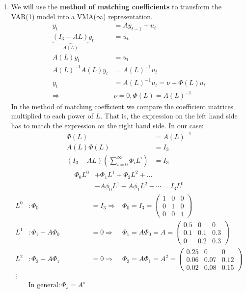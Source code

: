 \begin{enumerate}
\item We will use the \textbf{method of matching coefficients} to transform the VAR(1) model into a VMA(\(\infty\)) representation.
\begin{align*}
	y_t &= A y_{t-1} + u_t\\
	\underbrace{(I_3 - A L)}_{A(L)} y_t &= u_t\\
	A(L) y_t &= u_t \\
	{A(L)}^{-1}A(L) y_t &= {A(L)}^{-1} u_t\\
	y_t &= {A(L)}^{-1} u_t = \nu + \Phi(L) u_t\\
	\Rightarrow & \nu= 0, \Phi(L) = {A(L)}^{-1}
\end{align*}
In the method of matching coefficient we compare the coefficient matrices multiplied to each power of \(L\).
That is, the expression on the left hand side has to match the expression on the right hand side.
In our case:
\begin{align*}
	\Phi(L) &= {A(L)}^{-1}\\
	A(L) \Phi(L) &= I_3\\
	(I_3 - A L) \left(\sum_{i=0}^\infty \Phi_i L^i\right) &= I_3
\end{align*}
\begin{align*}
	\Phi_0 L^0 &+ \Phi_1 L^1 + \Phi_2 L^2 + \dots \\
	& - A \phi_0 L^1 - A \phi_1 L^2 - \cdots = I_3 L^0
\end{align*}
\begin{align*}
	L^0&: \Phi_0 &= I_3 \Rightarrow& \Phi_0 = I_3 = \begin{pmatrix}1&0&0\\0&1&0\\0&0&1 \end{pmatrix}\nonumber
	\\
	L^1&: \Phi_1 - A \Phi_0 &= 0 \Rightarrow& \Phi_1 = A \Phi_0 = A = \begin{pmatrix}0.5&0&0\\0.1&0.1&0.3\\0&0.2&0.3 \end{pmatrix}\nonumber
	\\
	L^2&: \Phi_2 - A \Phi_1 &= 0 \Rightarrow& \Phi_2 = A \Phi_1 = A^2 = \begin{pmatrix}0.25&0&0\\0.06&0.07&0.12\\0.02&0.08&0.15 \end{pmatrix}\nonumber
	\\
	\vdots\nonumber
	\\
	&\text{In general}: \Phi_s = A^s
\end{align*}
\end{enumerate}
